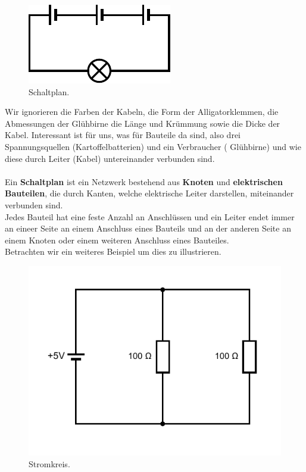 \documentclass[11pt,a4paper,leqno]{report}
\numberwithin{equation}{chapter}
\begin{document}
\begin{figure}[H]
	\begin{center}
		\includegraphics[scale=1]{kartoffel_diagram.pdf}
		\caption{Schaltplan.}
	\end{center}
\end{figure}
\noindent
Wir ignorieren die Farben der Kabeln, die Form der Alligatorklemmen, die Abmessungen der Gl\"uhbirne die L\"ange und Kr\"ummung sowie die Dicke der Kabel. Interessant ist f\"ur uns, was f\"ur Bauteile da sind, also drei Spannungsquellen (Kartoffelbatterien) und ein Verbraucher ( Gl\"uhbirne) und wie diese durch Leiter (Kabel) untereinander verbunden sind.\\
\\
Ein \textbf{Schaltplan} ist ein Netzwerk bestehend aus \textbf{Knoten} und \textbf{elektrischen Bauteilen}, die durch Kanten, welche elektrische Leiter darstellen, miteinander verbunden sind.\\
Jedes Bauteil hat eine feste Anzahl an Anschl\"ussen und ein Leiter endet immer an eineer Seite an einem Anschluss eines Bauteils und an der anderen Seite an einem Knoten oder einem weiteren Anschluss eines Bauteiles.\\
Betrachten wir ein weiteres Beispiel um dies zu illustrieren. 
\begin{figure}[H]
	\begin{center}
		\includegraphics[scale=0.6]{circuit.pdf}
		\caption{Stromkreis.}
	\end{center}
\end{figure}
\end{document}

